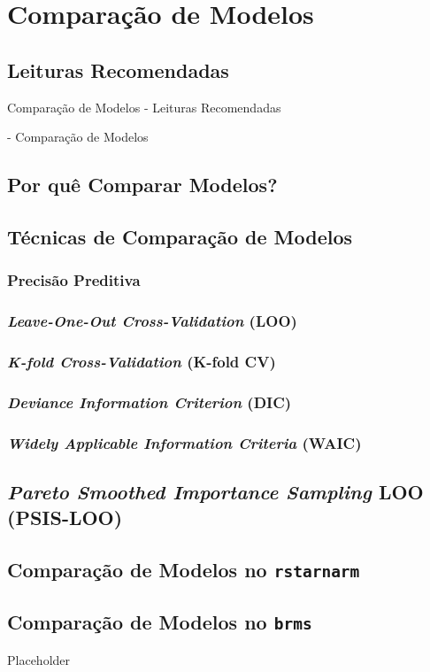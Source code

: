 \section{Comparação de Modelos}

\subsection{Leituras Recomendadas}
\begin{frame}{Comparação de Modelos - Leituras Recomendadas}
    \begin{vfilleditems}
        \item \textcite{storopoli2021estatisticabayesianaR} - Comparação de Modelos
    \end{vfilleditems}
\end{frame}

\subsection{Por quê Comparar Modelos?}

\subsection{Técnicas de Comparação de Modelos}
\subsubsection{Precisão Preditiva}
\subsubsection{\textit{Leave-One-Out Cross-Validation} (LOO)}
\subsubsection{\textit{K-fold Cross-Validation} (K-fold CV)}
\subsubsection{\textit{Deviance Information Criterion} (DIC)}
\subsubsection{\textit{Widely Applicable Information Criteria} (WAIC)}

\subsection{\textit{Pareto Smoothed Importance Sampling} LOO (PSIS-LOO)}

\subsection{Comparação de Modelos no \texttt{rstarnarm}}

\subsection{Comparação de Modelos no \texttt{brms}}
\begin{frame}{Placeholder}

\end{frame}
